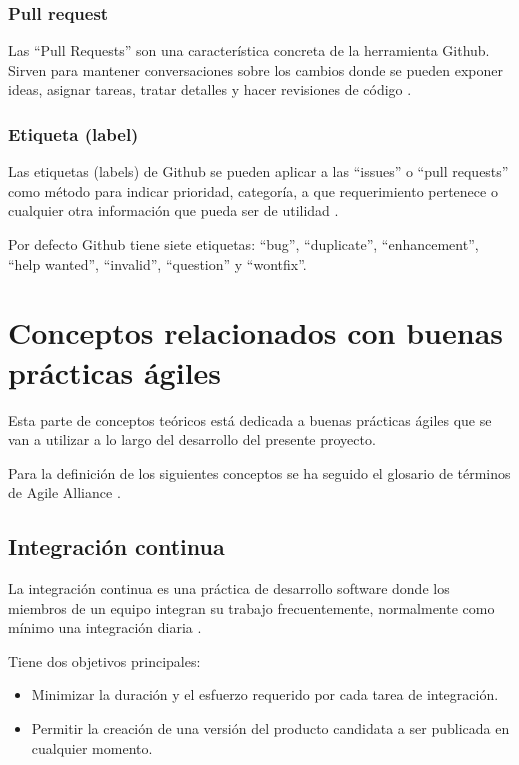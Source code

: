 \subsubsection{Pull request}

Las ``Pull Requests'' son una característica concreta de la herramienta Github. Sirven para mantener conversaciones sobre los cambios donde se pueden exponer ideas, asignar tareas, tratar detalles y hacer revisiones de código \cite{github:features}.

\subsubsection{Etiqueta (label)}

Las etiquetas (labels) de Github se pueden aplicar a las ``issues'' o ``pull requests'' como método para indicar prioridad, categoría, a que requerimiento pertenece o cualquier otra información que pueda ser de utilidad .

Por defecto Github tiene siete etiquetas: ``bug'', ``duplicate'', ``enhancement'', ``help wanted'', ``invalid'', ``question'' y ``wontfix''.

\section{Conceptos relacionados con buenas prácticas ágiles}

Esta parte de conceptos teóricos está dedicada a buenas prácticas ágiles que se van a utilizar a lo largo del desarrollo del presente proyecto.

Para la definición de los siguientes conceptos se ha seguido el glosario de términos de Agile Alliance \cite{agilealliance:glossary}.

\subsection{Integración continua}

La integración continua es una práctica de desarrollo software donde los miembros de un equipo integran su trabajo frecuentemente, normalmente como mínimo una integración diaria \cite{fowler2006continuous}.

Tiene dos objetivos principales:

\begin{itemize}
	\item Minimizar la duración y el esfuerzo requerido por cada tarea de integración.
	\item Permitir la creación de una versión del producto candidata a ser publicada en cualquier momento.
\end{itemize}

